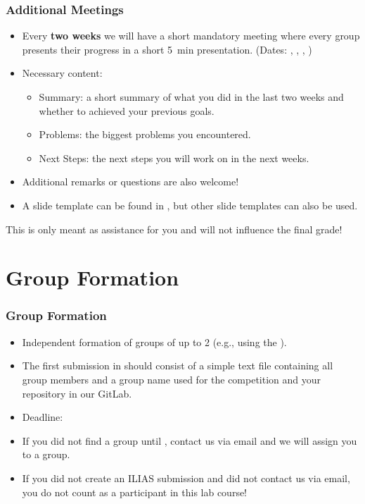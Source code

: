 \begin{frame}
	\frametitle{Additional Meetings}
	\begin{itemize}
		\item Every \textbf{two weeks} we will have a short mandatory meeting where every group presents their progress in a short \SI{5}{\minute} presentation. (Dates: \dateDeadlinePhaseOneFirstMeeting, \dateDeadlinePhaseOneSecondMeeting,
        \dateDeadlinePhaseTwoFirstMeeting, \dateDeadlinePhaseTwoSecondMeeting)
		\item Necessary content: 
		\begin{itemize}
			\item Summary: a short summary of what you did in the last two weeks and whether to achieved your previous goals.
			\item Problems: the biggest problems you encountered. 
			\item Next Steps: the next steps you will work on in the next weeks. 
		\end{itemize}
		\item Additional remarks or questions are also welcome!
		\item A slide template can be found in , but other slide templates can also be used. 
	\end{itemize}
	\vfill
	\DisplayRightArrow This is only meant as assistance for you and will not influence the final grade!
\end{frame}

\section*{Group Formation}
\begin{frame}[fragile]
  \frametitle{Group Formation}
  \begin{itemize}
      \item Independent formation of groups of up to 2 (e.g., using the ).
      \item The first submission in  should consist of a simple text file containing all group members and a group name used for the competition and your repository in our GitLab.
      \item Deadline: \textbf{\dateDeadlinePhaseZero}
      \item If you did not find a group until \dateDeadlinePhaseZero, contact us via email and we will assign you to a group.
      \item If you did not create an ILIAS submission and did not contact us via email, you do not count as a participant in this lab course!
  \end{itemize}
\end{frame}

